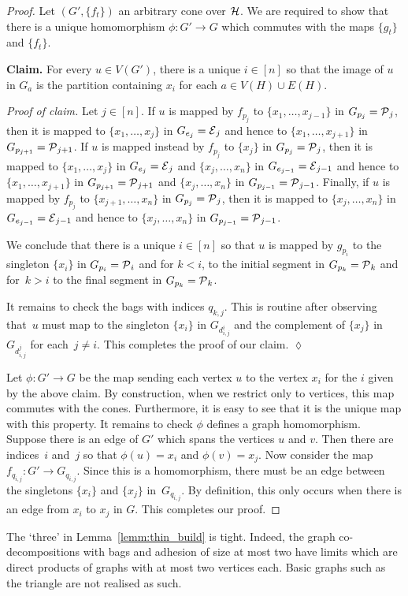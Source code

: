 \begin{proof}
    Let $(G',\{f_t\})$ an arbitrary cone over $\operatorname{\mathcal{H}}$. We are required to show that there is a unique homomorphism $\phi:G'\rightarrow G$ which commutes with the maps $\{g_t\}$ and $\{f_t\}$.

    \noindent\textbf{Claim.} For every $u\in V(G')$, there is a unique $i\in [n]$ so that the image of $u$ in $G_a$ is the partition containing $x_i$ for each $a\in V(H)\cup E(H)$.
    
    \noindent\textit{Proof of claim.} Let $j\in [n]$. If $u$ is mapped by $f_{p_j}$ to $\{x_1,\ldots,x_{j-1}\}$ in $G_{p_j}=\operatorname{\mathcal{P}}_j$, then it is mapped to $\{x_1,\ldots,x_{j}\}$ in $G_{e_{j}}=\operatorname{\mathcal{E}}_j$ and hence to $\{x_1,\ldots,x_{j+1}\}$ in $G_{p_{j+1}}=\operatorname{\mathcal{P}}_{j+1}$. If $u$ is mapped instead by $f_{p_j}$ to $\{x_{j}\}$ in $G_{p_j}=\operatorname{\mathcal{P}}_j$, then it is mapped to $\{x_1,\ldots,x_{j}\}$ in $G_{e_{j}}=\operatorname{\mathcal{E}}_j$ and $\{x_j,\ldots,x_n\}$ in $G_{e_{j-1}}=\operatorname{\mathcal{E}}_{j-1}$ and hence to $\{x_1,\ldots,x_{j+1}\}$ in $G_{p_{j+1}}=\operatorname{\mathcal{P}}_{j+1}$ and $\{x_j,\ldots,x_{n}\}$ in $G_{p_{j-1}}=\operatorname{\mathcal{P}}_{j-1}$. Finally, if $u$ is mapped by $f_{p_j}$ to $\{x_{j+1},\ldots,x_n\}$ in $G_{p_j}=\operatorname{\mathcal{P}}_j$, then it is mapped to $\{x_j,\ldots,x_n\}$ in $G_{e_{j-1}}=\operatorname{\mathcal{E}}_{j-1}$ and hence to $\{x_j,\ldots,x_n\}$ in $G_{p_{j-1}}=\operatorname{\mathcal{P}}_{j-1}$.

    We conclude that there is a unique $i\in[n]$ so that $u$ is mapped by $g_{p_i}$ to the singleton $\{x_i\}$ in $G_{p_i}=\operatorname{\mathcal{P}}_i$ and for $k<i$, to the initial segment in $G_{p_k}=\operatorname{\mathcal{P}}_k$ and for~$k>i$ to the final segment in $G_{p_k}=\operatorname{\mathcal{P}}_k$.
    
    It remains to check the bags with indices $q_{k,j}$. This is routine after observing that~$u$ must map to the singleton $\{x_i\}$ in $G_{d_{i,j}^i}$ and the complement of $\{x_j\}$ in $G_{d_{i,j}^j}$ for each~$j\neq i$. This completes the proof of our claim. \hfill$\lozenge$

    Let $\phi:G'\rightarrow G$ be the map sending each vertex $u$ to the vertex $x_i$ for the $i$ given by the above claim. By construction, when we restrict only to vertices, this map commutes with the cones. Furthermore, it is easy to see that it is the unique map with this property. It remains to check $\phi$ defines a graph homomorphism. Suppose there is an edge of $G'$ which spans the vertices $u$ and $v$. Then there are indices~$i$ and~$j$ so that $\phi(u)=x_i$ and $\phi(v)=x_j$. Now consider the map $f_{q_{i,j}}:G'\rightarrow G_{q_{i,j}}$. Since this is a homomorphism, there must be an edge between the singletons $\{x_i\}$ and $\{x_j\}$ in~$G_{q_{i,j}}$. By definition, this only occurs when there is an edge from $x_i$ to $x_j$ in $G$. This completes our proof. 
\end{proof}

\begin{example}
    The `three' in Lemma~\ref{lemm:thin_build} is tight. Indeed, the graph co-decompositions with bags and adhesion of size at most two have limits which are direct products of graphs with at most two vertices each. Basic graphs such as the triangle are not realised as such.
\end{example}